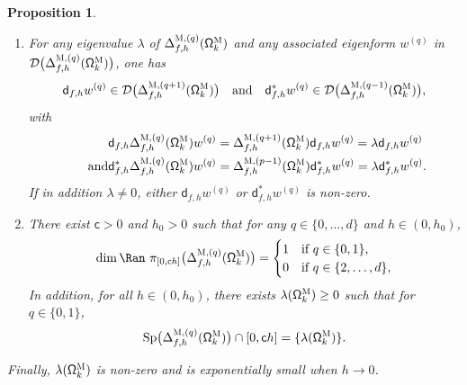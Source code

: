 \documentclass[10pt]{amsart}
\newenvironment{enumeratei}
{\bgroup\def\theenumi{\roman{enumi}}\def\theenumii{\arabic{enumii}}\begin{enumerate}}
{\end{enumerate}\egroup}
\newcommand{\quand}{\quad\text{and}\quad}
\DeclareMathOperator\Sp{Sp}
\theoremstyle{plain}
\newtheorem{proposition}{Proposition}
\theoremstyle{definition}
\begin{document}
\begin{proposition}
\begin{enumeratei}
\item\label{pr.DeltaTNii}
For any eigenvalue $\lambda$ of $\Delta_{f,h}^{\textsc{M}, (q)} (\mathsf \Omega_k^{\textsc{M}})$
and any associated eigenform $w_{}^{(q)}$ in $\mathcal D\bigl(\Delta_{f,h}^{\textsc{M}, (q)} (\mathsf \Omega_k^{\textsc{M}})\bigr)$, one has\vspace*{-3pt}
\[
\mathsf d_{f,h}w_{}^{(q)}\in\mathcal D\bigl(\Delta_{f,h}^{\textsc{M},(q+1)}(\mathsf \Omega_k^{\textsc{M}}) \bigr)
\quand
\mathsf d^{*}_{f,h}w_{}^{(q)}\in \mathcal D\bigl(\Delta_{f,h}^{\textsc{M},(q-1)}(\mathsf \Omega_k^{\textsc{M}}) \bigr),
\]
with\vspace*{-7pt}
\begin{align*}
\mathsf d_{f,h}\Delta_{f,h}^{\textsc{M}, (q)}(\mathsf
\Omega_k^{\textsc{M}}) w_{}^{(q)}&=
\Delta_{f,h}^{\textsc{M}, (q+1)}(\mathsf \Omega_k^{\textsc{M}})\mathsf d_{f,h}w_{}^{(q)}
= \lambda \mathsf d_{f,h}w_{}^{(q)}
\\
\tag*{and}
\mathsf d^*_{f,h}\Delta_{f,h}^{\textsc{M},(q)} (\mathsf \Omega_k^{\textsc{M}})w_{}^{(q)}&=
\Delta_{f,h}^{\textsc{M},(p-1)} (\mathsf \Omega_k^{\textsc{M}})\mathsf d^*_{f,h}w_{}^{(q)}
= \lambda\mathsf d^*_{f,h}w_{}^{(q)}.
\end{align*}
If in addition $\lambda\neq 0$, either $\mathsf d_{f,h}w_{}^{(q)}$ or $\mathsf d^*_{f,h}w_{}^{(q)}$ is non-zero.
\item\label{pr.DeltaTNiii}
There exist $\mathsf c>0$ and $h_0>0$ such that for any $q\in\{0,\dots,d\}$ and $h\in (0,h_0)$,\vspace*{-3pt}
\[
\dim\Ran \ \pi_{[0,\mathsf ch ]}\bigl(\Delta_{f,h}^{\textsc{M},(q)} (\mathsf \Omega_k^{\textsc{M}})\bigr)
=\begin{cases}
1 &\text{if}\ q\in\{0,1\},\\
0 &\text{if} \ q\in\{2,\ldots,d\},
\end{cases}
\]
In addition, for all $h\in (0,h_0)$, there exists $\lambda(\mathsf \Omega_k^{\textsc{M}})\ge 0$ such that for $q\in \{0,1\}$,\vspace*{-3pt}
\[
\Sp \bigl(\Delta_{f,h}^{\textsc{M},(q)} (\mathsf \Omega_k^{\textsc{M}})\bigr)\cap [0,\mathsf ch ]
=
\{ \lambda(\mathsf \Omega_k^{\textsc{M}})\}.
\]
\end{enumeratei}
Finally, $\lambda(\mathsf \Omega_k^{\textsc{M}})$ is non-zero and is exponentially small when $h\to 0$.
\end{proposition}
\end{document}
